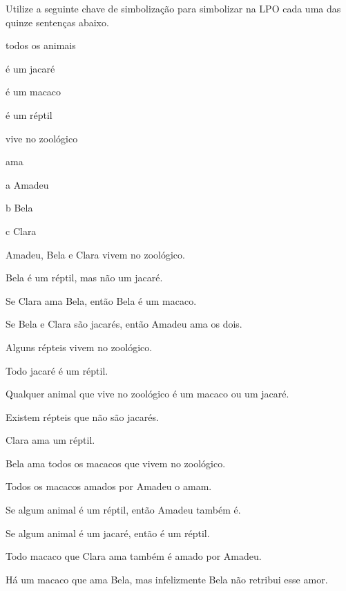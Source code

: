 \practiceproblems
\solutions
\problempart
Utilize a seguinte chave de simbolização para simbolizar na LPO cada uma das quinze sentenças abaixo.
\begin{center}
\begin{ekey}
\item[\text{domínio}] todos os animais
\item[\atom{J}{x}]  é um jacaré
\item[\atom{M}{x}]  é um macaco
\item[\atom{R}{x}]  é um réptil
\item[\atom{Z}{x}]  vive no zoológico
\item[\atom{A}{x,y}]  ama 
\item[a] Amadeu
\item[b] Bela
\item[c] Clara
\end{ekey}
\end{center}
\begin{earg}
\item Amadeu, Bela e Clara vivem no zoológico.
\item Bela é um réptil, mas não um jacaré.
\item Se Clara ama Bela, então Bela é um macaco.
\item Se Bela e Clara são jacarés, então Amadeu ama os dois.
\item Alguns répteis vivem no zoológico.
\item Todo jacaré é um réptil.
\item Qualquer animal que vive no zoológico é um macaco ou um jacaré.
\item Existem répteis que não são jacarés.
\item Clara ama um réptil.
\item Bela ama todos os macacos que vivem no zoológico.
\item Todos os macacos amados por Amadeu o amam.
\item Se algum animal é um réptil, então Amadeu também é.
\item Se algum animal é um jacaré, então é um réptil.
\item Todo macaco que Clara ama também é amado por Amadeu.
\item Há um macaco que ama Bela, mas infelizmente Bela não retribui esse amor.
\end{earg}

